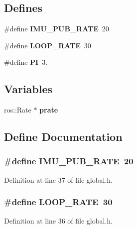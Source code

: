 \subsection*{\-Defines}
\begin{DoxyCompactItemize}
\item 
\#define {\bf \-I\-M\-U\-\_\-\-P\-U\-B\-\_\-\-R\-A\-T\-E}~20
\item 
\#define {\bf \-L\-O\-O\-P\-\_\-\-R\-A\-T\-E}~30
\item 
\#define {\bf \-P\-I}~3.
\end{DoxyCompactItemize}
\subsection*{\-Variables}
\begin{DoxyCompactItemize}
\item 
ros\-::\-Rate $\ast$ {\bf prate}
\end{DoxyCompactItemize}


\subsection{\-Define \-Documentation}
\subsubsection[{\-I\-M\-U\-\_\-\-P\-U\-B\-\_\-\-R\-A\-T\-E}]{\setlength{\rightskip}{0pt plus 5cm}\#define {\bf \-I\-M\-U\-\_\-\-P\-U\-B\-\_\-\-R\-A\-T\-E}~20}\label{global_8h_aa06f7ad5200a8934ffb0e5d6562df0fd}


\-Definition at line 37 of file global.\-h.

\subsubsection[{\-L\-O\-O\-P\-\_\-\-R\-A\-T\-E}]{\setlength{\rightskip}{0pt plus 5cm}\#define {\bf \-L\-O\-O\-P\-\_\-\-R\-A\-T\-E}~30}\label{global_8h_af1b1b0c2f181806b4926f2f161e8d06a}


\-Definition at line 36 of file global.\-h.

